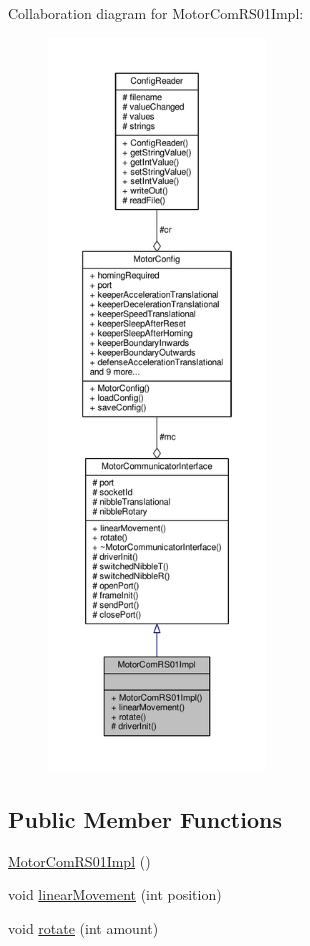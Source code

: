 Collaboration diagram for Motor\+Com\+R\+S01\+Impl\+:\nopagebreak
\begin{figure}[H]
\begin{center}
\leavevmode
\includegraphics[height=550pt]{class_motor_com_r_s01_impl__coll__graph}
\end{center}
\end{figure}
\subsection*{Public Member Functions}
\begin{DoxyCompactItemize}
\item 
\hyperlink{class_motor_com_r_s01_impl_a1f30f6ac77e75f0d69ea83db894a5ccf}{Motor\+Com\+R\+S01\+Impl} ()
\item 
void \hyperlink{class_motor_com_r_s01_impl_a329b9e6783f49d16ad6a57a34b1d29a3}{linear\+Movement} (int position)
\item 
void \hyperlink{class_motor_com_r_s01_impl_aacd356794c8c05da436e52293b41476d}{rotate} (int amount)
\end{DoxyCompactItemize}
